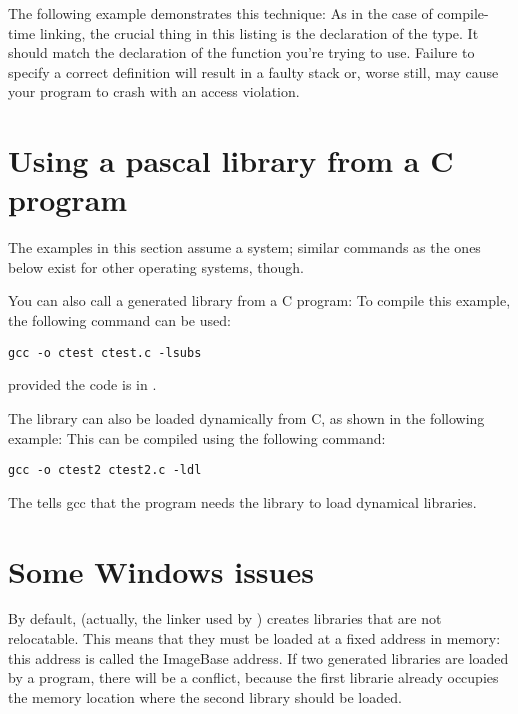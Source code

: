 The following example demonstrates this technique:
As in the case of compile-time linking, the crucial thing in this
listing is the declaration of the  type.
It should match the declaration of the function you're trying to use.
Failure to specify a correct definition will result in a faulty stack or,
worse still, may cause your program to crash with an access violation.

\section{Using a pascal library from a C program}

\begin{remark}The examples in this section assume a \linux system; similar commands
as the ones below exist for other operating systems, though.
\end{remark}

You can also call a \fpc generated library from a C program:
To compile this example, the following command can be used:
\begin{verbatim}
gcc -o ctest ctest.c -lsubs
\end{verbatim}
provided the code is in .

The library can also be loaded dynamically from C, as shown in the following
example:
This can be compiled using the following command:
\begin{verbatim}
gcc -o ctest2 ctest2.c -ldl
\end{verbatim}

The  tells gcc that the program needs the  library
to load dynamical libraries.

\section{Some Windows issues}
\label{shlibwinissues}
By default, \fpc (actually, the linker used by \fpc)
creates libraries that are not relocatable. This means that they must be
loaded at a fixed address in memory: this address is called the
ImageBase address. If two \fpc generated libraries are loaded by a
program, there will be a conflict, because the first librarie already
occupies the memory location where the second library should be loaded.

